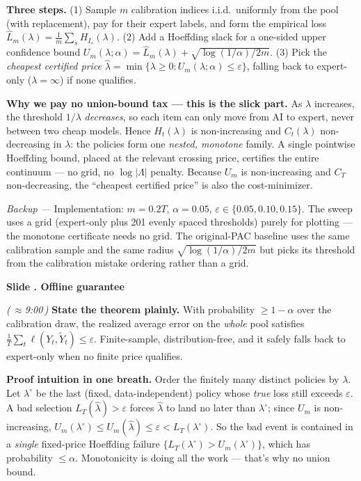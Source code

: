 \documentclass[11pt]{article}
\newcommand{\eps}{\varepsilon}
\newcommand{\hatL}{\widehat L}
\newcommand{\tildeY}{\widetilde Y}
\newcommand{\cue}[1]{\textcolor{blue!60!black}{\textbf{#1}}}
\newcommand{\timecue}[1]{\hfill{\small\itshape(\,$\approx$#1\,)}}
\newcommand{\backup}[1]{{\small\textcolor{black!72}{\textit{Backup --- } #1}}}
\renewcommand{\thesection}{\arabic{section}}
\renewcommand{\section}[1]{%
  \refstepcounter{section}%
  \par\vspace{0.6\baselineskip}%
  {\large\bfseries\color{blue!45!black}Slide \thesection. #1}\par
  \vspace{0.2\baselineskip}}
\begin{document}
\cue{Three steps.} (1) Sample $m$ calibration indices i.i.d.\ uniformly from the
pool (with replacement), pay for their expert labels, and form the empirical
loss $\hatL_m(\lambda)=\frac1m\sum_s H_{I_s}(\lambda)$. (2) Add a Hoeffding slack
for a one-sided upper confidence bound
$U_m(\lambda;\alpha)=\hatL_m(\lambda)+\sqrt{\log(1/\alpha)/2m}$. (3) Pick the
\emph{cheapest certified price}
$\hat\lambda=\min\{\lambda\ge0:U_m(\lambda;\alpha)\le\eps\}$, falling back to
expert-only ($\lambda=\infty$) if none qualifies.

\cue{Why we pay no union-bound tax --- this is the slick part.} As $\lambda$
increases, the threshold $1/\lambda$ \emph{decreases}, so each item can only move
from AI to expert, never between two cheap models. Hence $H_t(\lambda)$ is
non-increasing and $C_t(\lambda)$ non-decreasing in $\lambda$: the policies form
one \emph{nested, monotone} family. A single pointwise Hoeffding bound, placed at
the relevant crossing price, certifies the entire continuum --- no grid, no
$\log|\Lambda|$ penalty. Because $U_m$ is non-increasing and $C_T$
non-decreasing, the ``cheapest certified price'' is also the cost-minimizer.

\backup{Implementation: $m=0.2T$, $\alpha=0.05$, $\eps\in\{0.05,0.10,0.15\}$.
The sweep uses a grid (expert-only plus 201 evenly spaced thresholds) purely for
plotting --- the monotone certificate needs no grid. The original-PAC baseline
uses the same calibration sample and the same radius
$\sqrt{\log(1/\alpha)/2m}$ but picks its threshold from the calibration mistake
ordering rather than a grid.}

\section{Offline guarantee}
\timecue{9:00}
\cue{State the theorem plainly.} With probability $\ge1-\alpha$ over the
calibration draw, the realized average error on the \emph{whole} pool satisfies
$\frac1T\sum_t\ell(Y_t,\tildeY_t)\le\eps$. Finite-sample, distribution-free, and
it safely falls back to expert-only when no finite price qualifies.

\cue{Proof intuition in one breath.} Order the finitely many distinct policies by
$\lambda$. Let $\lambda^\circ$ be the last (fixed, data-independent) policy whose
\emph{true} loss still exceeds $\eps$. A bad selection $L_T(\hat\lambda)>\eps$
forces $\hat\lambda$ to land no later than $\lambda^\circ$; since $U_m$ is
non-increasing, $U_m(\lambda^\circ)\le U_m(\hat\lambda)\le\eps<L_T(\lambda^\circ)$.
So the bad event is contained in a \emph{single} fixed-price Hoeffding failure
$\{L_T(\lambda^\circ)>U_m(\lambda^\circ)\}$, which has probability $\le\alpha$.
Monotonicity is doing all the work --- that's why no union bound.
\end{document}
